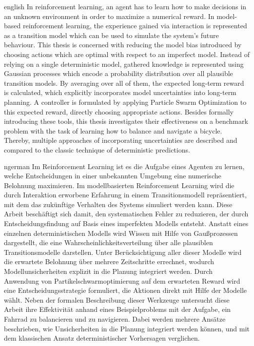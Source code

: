 \begin{Abstract}{english}
In reinforcement learning, an agent has to learn how to make decisions in an unknown environment in order to maximize a numerical reward.
In model-based reinforcement learning, the experience gained via interaction is represented as a transition model which can be used to simulate the system's future behaviour.
This thesis is concerned with reducing the model bias introduced by choosing actions which are optimal with respect to an imperfect model.
Instead of relying on a single deterministic model, gathered knowledge is represented using Gaussian processes which encode a probability distribution over all plausible transition models.
By averaging over all of them, the expected long-term reward is calculated, which explicitly incorporates model uncertainties into long-term planning.
A controller is formulated by applying Particle Swarm Optimization to this expected reward, directly choosing appropriate actions.
Besides formally introducing these tools, this thesis investigates their effectiveness on a benchmark problem with the task of learning how to balance and navigate a bicycle.
Thereby, multiple approaches of incorporating uncertainties are described and compared to the classic technique of deterministic predictions.
\end{Abstract}

\begin{Abstract}{ngerman}
Im Reinforcement Learning ist es die Aufgabe eines Agenten zu lernen, welche Entscheidungen in einer unbekannten Umgebung eine numerische Belohnung maximieren.
Im modellbasierten Reinforcement Learning wird die durch Interaktion erworbene Erfahrung in einem Transitionsmodell repräsentiert, mit dem das zukünftige Verhalten des Systems simuliert werden kann.
Diese Arbeit beschäftigt sich damit, den systematischen Fehler zu reduzieren, der durch Entscheidungsfindung auf Basis eines imperfekten Modells entsteht.
Anstatt eines einzelnen deterministischen Modells wird Wissen mit Hilfe von Gaußprozessen dargestellt, die eine Wahrscheinlichkeitsverteilung über alle plausiblen Transitionsmodelle darstellen.
Unter Berücksichtigung aller dieser Modelle wird die erwartete Belohnung über mehrere Zeitschritte errechnet, wodurch Modellunsicherheiten explizit in die Planung integriert werden.
Durch Anwendung von Partikelschwarmoptimierung auf dem erwarteten Reward wird eine Entscheidungsstrategie formuliert, die Aktionen direkt mit Hilfe der Modelle wählt.
Neben der formalen Beschreibung dieser Werkzeuge untersucht diese Arbeit ihre Effektivität anhand eines Beispielproblems mit der Aufgabe, ein Fahrrad zu balancieren und zu navigieren.
Dabei werden mehrere Ansätze beschrieben, wie Unsicherheiten in die Planung integriert werden können, und mit dem klassischen Ansatz deterministischer Vorhersagen verglichen.
\end{Abstract}
